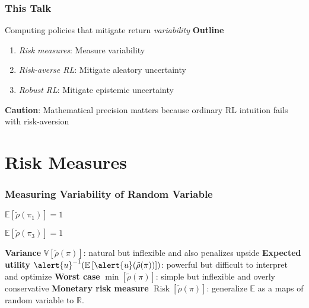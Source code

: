 \documentclass{beamer}
\newcommand{\risko}{\operatorname{Risk}}
\newcommand{\risk}[1]{\risko\left[#1\right]}
\begin{document}
\begin{frame} \frametitle{This Talk}
  Computing policies that mitigate return \emph{variability}
  \vfill
  \textbf{Outline}
  \begin{enumerate}
    \item \emph{Risk measures}: Measure variability
    \item \emph{Risk-averse RL}: Mitigate aleatory uncertainty
    \item \emph{Robust RL}: Mitigate epistemic uncertainty
    \end{enumerate}
    \vfill
    \textbf{Caution}: Mathematical precision matters because ordinary RL intuition fails with risk-aversion
\end{frame}





\section{Risk Measures}

\begin{frame} \frametitle{Measuring Variability of Random Variable}
  \begin{center}
  \begin{minipage}{0.25\linewidth}
    \centering
    $ \mathbb{E}\left[\tilde{\rho}(\pi_1)\right] = 1$
  \end{minipage}
  \hspace{0.2\linewidth}
  \begin{minipage}{0.25\linewidth}
    \centering
    $ \mathbb{E}\left[\tilde{\rho}(\pi_3)\right] = 1$
  \end{minipage}
  \end{center}
 \vfill 
 \textbf{Variance} $\mathbb{V}\left[ \tilde{\rho}(\pi) \right]$: natural but inflexible and also penalizes upside
 \vfill
 \textbf{Expected utility} $\alert{u}^{-1}(\mathbb{E}\left[\alert{u}(\tilde{\rho}(\pi)) \right])$: powerful but difficult to interpret and optimize
 \vfill
 \textbf{Worst case} $\min \left[  \tilde{\rho}(\pi) \right]$: simple but inflexible and overly conservative
 \vfill 
 \textbf{Monetary risk measure} $\risk{\tilde{\rho}(\pi)}$: generalize $\mathbb{E}$ as a maps of random variable to $\mathbb{R}$.
\end{frame}
\end{document}
